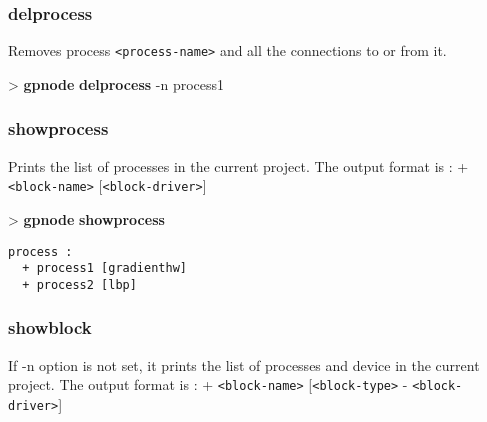 \documentclass[10pt,a4paper]{article}
\begin{document}

\subsubsection{delprocess}

Removes process \texttt{<process-name>} and all the connections to or from it.\\


\begin{sampletitle}
> \textbf{gpnode} \textbf{delprocess} -n process1
\end{sampletitle}


\subsubsection{showprocess}

Prints the list of processes in the current project. The output format is : + \texttt{<block-name>} [\texttt{<block-driver>}]

\begin{sampletitle}
> \textbf{gpnode} \textbf{showprocess}
\begin{Verbatim}
process :
  + process1 [gradienthw]
  + process2 [lbp]
\end{Verbatim}
\end{sampletitle}

\subsubsection{showblock}

If -n option is not set, it prints the list of processes and device in the current project. The output format is : + \texttt{<block-name>} [\texttt{<block-type>} - \texttt{<block-driver>}]\\

\end{document}
